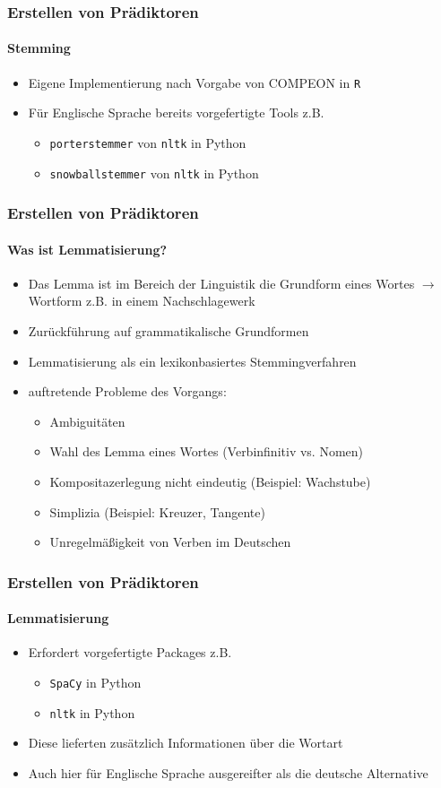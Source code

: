 \begin{frame}
\frametitle{Erstellen von Prädiktoren}
\framesubtitle{Stemming}
\begin{itemize}\itemsep12pt
\item Eigene Implementierung nach Vorgabe von COMPEON in \texttt{R}
\item Für Englische Sprache bereits vorgefertigte Tools z.B. 
\begin{itemize}
\item \texttt{porterstemmer} von \texttt{nltk} in Python
\item \texttt{snowballstemmer} von \texttt{nltk} in Python
\end{itemize}
\end{itemize}

\end{frame}

\begin{frame}
\frametitle{Erstellen von Prädiktoren}
\framesubtitle{Was ist Lemmatisierung?}
\begin{itemize}
\item Das Lemma ist im Bereich der Linguistik die Grundform eines Wortes $\rightarrow$ Wortform z.B. in einem Nachschlagewerk
\item Zurückführung auf grammatikalische Grundformen
\item Lemmatisierung als ein lexikonbasiertes Stemmingverfahren
\item auftretende Probleme des Vorgangs:
\begin{itemize}
\item Ambiguitäten
\item Wahl des Lemma eines Wortes (Verbinfinitiv vs. Nomen)
\item Kompositazerlegung nicht eindeutig (Beispiel: Wachstube)
\item Simplizia (Beispiel: Kreuzer, Tangente)
\item Unregelmäßigkeit von Verben im Deutschen
\end{itemize}

\end{itemize}

\end{frame}

\begin{frame}
\frametitle{Erstellen von Prädiktoren}
\framesubtitle{Lemmatisierung}
\begin{itemize}\itemsep12pt
\item Erfordert vorgefertigte Packages z.B.
\begin{itemize}
\item \texttt{SpaCy} in Python
\item \texttt{nltk} in Python
\end{itemize}
\item Diese lieferten zusätzlich Informationen über die Wortart
\item Auch hier für Englische Sprache ausgereifter als die deutsche Alternative
\end{itemize}
\end{frame}

